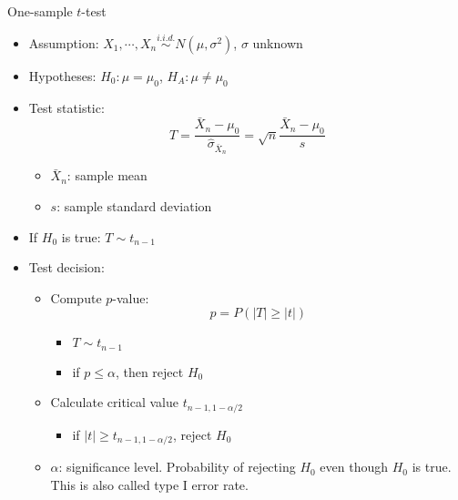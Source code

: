 \documentclass[a4paper]{article}
\begin{document}
One-sample $t$-test
\begin{itemize}
    \item Assumption: $X_1,\cdots,X_n \overset{i.i.d.}{\sim} N(\mu,\sigma^2)$, $\sigma$ unknown
    \item Hypotheses: $H_0:\mu=\mu_0$, $H_A:\mu\neq\mu_0$
    \item Test statistic:
    \[T=\frac{\bar{X}_n-\mu_0}{\hat{\sigma}_{\bar{X}_n}}=\sqrt{n}\frac{\bar{X}_n-\mu_0}{s} \]
    \begin{itemize}
        \item $\bar{X}_{n}$: sample mean
        \item $s$: sample standard deviation
    \end{itemize}
    \item If $H_0$ is true: $T\sim t_{n-1}$
    \item Test decision:
    \begin{itemize}
        \item Compute $p$-value:
        \[p=P(\lvert T\rvert\geq\lvert t\rvert) \]
        \begin{itemize}
            \item $T\sim t_{n-1}$
            \item if $p\leq\alpha$, then reject $H_0$
        \end{itemize}
        \item Calculate critical value $t_{n-1,1-\alpha/2}$
        \begin{itemize}
            \item if $\lvert t\rvert\geq t_{n-1,1-\alpha/2}$, reject $H_0$
        \end{itemize}
        \item $\alpha$: significance level. Probability of rejecting $H_0$ even though $H_0$ is true. This is also called type I error rate.
    \end{itemize}
\end{itemize}
\end{document}

